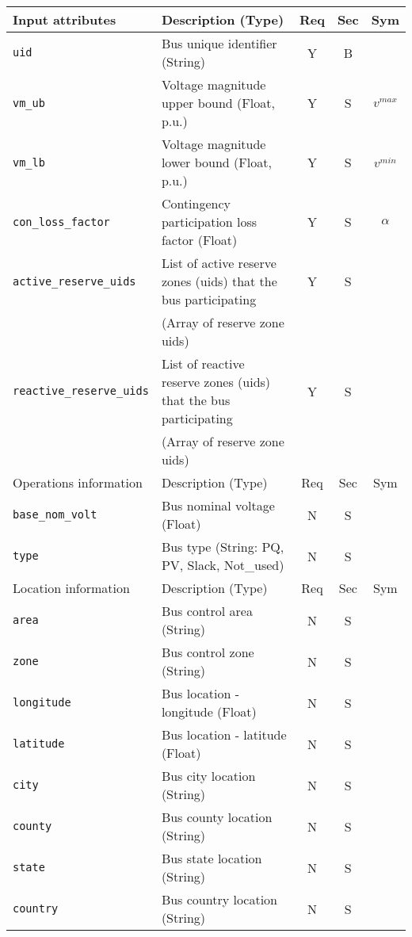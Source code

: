 \documentclass{article}
\begin{document}
\begin{center}
\small
\begin{tabular}{ l | l | c | c | c |}
Input attributes & Description (Type) & Req & Sec & Sym\\
\hline
  {\tt uid} & Bus unique identifier (String)& Y & B &  \\
  {\tt vm\_ub} & Voltage magnitude upper bound (Float, p.u.)& Y & S & $v^{max}$\\
  {\tt vm\_lb} & Voltage magnitude lower bound (Float, p.u.)& Y & S & $v^{min}$\\
  {\tt con\_loss\_factor} & Contingency participation loss factor (Float) & Y & S & $\alpha$\\
  {\tt active\_reserve\_uids} & List of active reserve zones (uids) that the bus participating & Y & S & \\ 
                     &  (Array of reserve zone uids) &  & & \\ 
  {\tt reactive\_reserve\_uids} & List of reactive reserve zones (uids) that the bus participating & Y & S & \\ 
                     &  (Array of reserve zone uids) &  & & \\                      
  \hline
  Operations information & Description (Type) & Req & Sec & Sym\\
  \hline
  {\tt base\_nom\_volt} & Bus nominal voltage (Float) & N & S & \\
  {\tt type} & Bus type (String: PQ, PV, Slack, Not\_used) & N & S &\\  
  \hline
  Location information & Description (Type) & Req & Sec & Sym\\
  \hline
  {\tt area} &  Bus control area (String)& N & S & \\
  {\tt zone} &  Bus control zone (String)& N & S & \\ 
  {\tt longitude} & Bus location - longitude (Float) & N & S & \\
  {\tt latitude} & Bus location - latitude (Float) & N & S & \\
  {\tt city}     & Bus city location (String) & N & S & \\
  {\tt county}     & Bus county location (String) & N & S & \\
  {\tt state}    & Bus state location (String) & N & S & \\
  {\tt country}  & Bus country location (String) & N & S & \\
  \hline  
\end{tabular}
\end{center}
\end{document}
